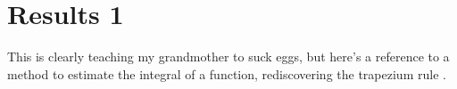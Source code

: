 \chapter{Results 1}

This is clearly teaching my grandmother to suck eggs, but here's a reference to a method to estimate the integral of a function, rediscovering the trapezium rule \citep{10.2337/diacare.17.2.152}.